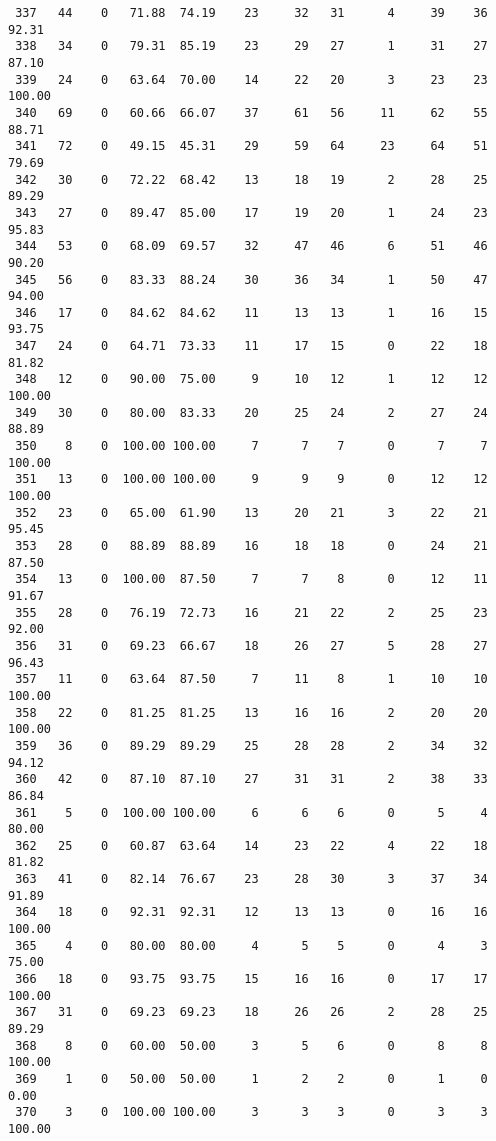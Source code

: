 \begin{verbatim}
 337   44    0   71.88  74.19    23     32   31      4     39    36    92.31
 338   34    0   79.31  85.19    23     29   27      1     31    27    87.10
 339   24    0   63.64  70.00    14     22   20      3     23    23   100.00
 340   69    0   60.66  66.07    37     61   56     11     62    55    88.71
 341   72    0   49.15  45.31    29     59   64     23     64    51    79.69
 342   30    0   72.22  68.42    13     18   19      2     28    25    89.29
 343   27    0   89.47  85.00    17     19   20      1     24    23    95.83
 344   53    0   68.09  69.57    32     47   46      6     51    46    90.20
 345   56    0   83.33  88.24    30     36   34      1     50    47    94.00
 346   17    0   84.62  84.62    11     13   13      1     16    15    93.75
 347   24    0   64.71  73.33    11     17   15      0     22    18    81.82
 348   12    0   90.00  75.00     9     10   12      1     12    12   100.00
 349   30    0   80.00  83.33    20     25   24      2     27    24    88.89
 350    8    0  100.00 100.00     7      7    7      0      7     7   100.00
 351   13    0  100.00 100.00     9      9    9      0     12    12   100.00
 352   23    0   65.00  61.90    13     20   21      3     22    21    95.45
 353   28    0   88.89  88.89    16     18   18      0     24    21    87.50
 354   13    0  100.00  87.50     7      7    8      0     12    11    91.67
 355   28    0   76.19  72.73    16     21   22      2     25    23    92.00
 356   31    0   69.23  66.67    18     26   27      5     28    27    96.43
 357   11    0   63.64  87.50     7     11    8      1     10    10   100.00
 358   22    0   81.25  81.25    13     16   16      2     20    20   100.00
 359   36    0   89.29  89.29    25     28   28      2     34    32    94.12
 360   42    0   87.10  87.10    27     31   31      2     38    33    86.84
 361    5    0  100.00 100.00     6      6    6      0      5     4    80.00
 362   25    0   60.87  63.64    14     23   22      4     22    18    81.82
 363   41    0   82.14  76.67    23     28   30      3     37    34    91.89
 364   18    0   92.31  92.31    12     13   13      0     16    16   100.00
 365    4    0   80.00  80.00     4      5    5      0      4     3    75.00
 366   18    0   93.75  93.75    15     16   16      0     17    17   100.00
 367   31    0   69.23  69.23    18     26   26      2     28    25    89.29
 368    8    0   60.00  50.00     3      5    6      0      8     8   100.00
 369    1    0   50.00  50.00     1      2    2      0      1     0     0.00
 370    3    0  100.00 100.00     3      3    3      0      3     3   100.00

\end{verbatim}
